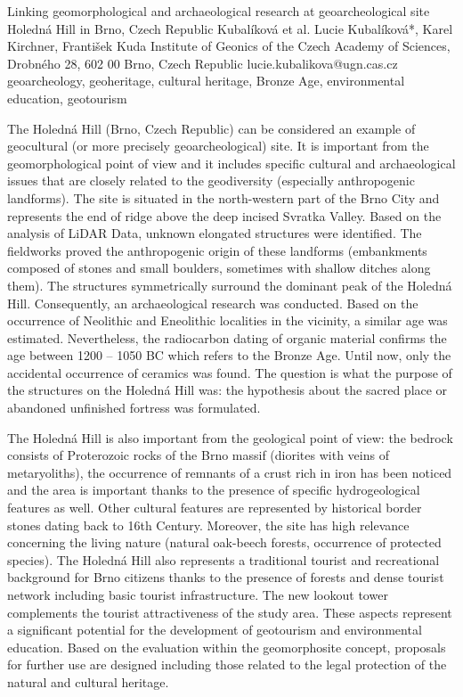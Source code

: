 \abstract
{Linking geomorphological and archaeological research at geoarcheological site Holedná Hill in Brno, Czech Republic} 
{Kubalíková et al.} 
{Lucie Kubalíková*, Karel Kirchner, František Kuda} 
{\POtag} 
{Institute of Geonics of the Czech Academy of Sciences, Drobného 28, 602 00 Brno, Czech Republic
}
{lucie.kubalikova@ugn.cas.cz}  %
{geoarcheology, geoheritage, cultural heritage, Bronze Age, environmental education, geotourism}
{The Holedná Hill (Brno, Czech Republic) can be considered an example of geocultural (or more precisely geoarcheological) site. It is important from the geomorphological point of view and it includes specific cultural and archaeological issues that are closely related to the geodiversity (especially anthropogenic landforms). The site is situated in the north-western part of the Brno City and represents the end of ridge above the deep incised Svratka Valley. Based on the analysis of LiDAR Data, unknown elongated structures were identified. The fieldworks proved the anthropogenic origin of these landforms (embankments composed of stones and small boulders, sometimes with shallow ditches along them). The structures symmetrically surround the dominant peak of the Holedná Hill. Consequently, an archaeological research was conducted. Based on the occurrence of Neolithic and Eneolithic localities in the vicinity, a similar age was estimated. Nevertheless, the radiocarbon dating of organic material confirms the age between 1200 -- 1050 BC which refers to the Bronze Age. Until now, only the accidental occurrence of ceramics was found. The question is what the purpose of the structures on the Holedná Hill was: the hypothesis about the sacred place or abandoned unfinished fortress was formulated.

The Holedná Hill is also important from the geological point of view: the bedrock consists of Proterozoic rocks of the Brno massif (diorites with veins of metaryoliths), the occurrence of remnants of a crust rich in iron has been noticed and the area is important thanks to the presence of specific hydrogeological features as well. Other cultural features are represented by historical border stones dating back to 16th Century. Moreover, the site has high relevance concerning the living nature (natural oak-beech forests, occurrence of protected species). The Holedná Hill also represents a traditional tourist and recreational background for Brno citizens thanks to the presence of forests and dense tourist network including basic tourist infrastructure. The new lookout tower complements the tourist attractiveness of the study area. These aspects represent a significant potential for the development of geotourism and environmental education. Based on the evaluation within the geomorphosite concept, proposals for further use are designed including those related to the legal protection of the natural and cultural heritage.
}
